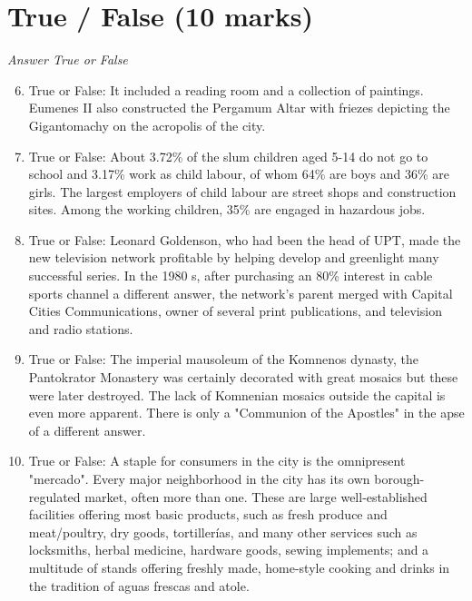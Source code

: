 \documentclass[12pt]{article}
\begin{document}
\section*{True / False (10 marks)}
\textit{Answer True or False}
\begin{enumerate}[label=\arabic*.]
\setcounter{enumi}{5}
\item True or False: It included a reading room and a collection of paintings. Eumenes II also constructed the Pergamum Altar with friezes depicting the Gigantomachy on the acropolis of the city.
\item True or False: About 3.72\% of the slum children aged 5-14 do not go to school and 3.17\% work as child labour, of whom 64\% are boys and 36\% are girls. The largest employers of child labour are street shops and construction sites. Among the working children, 35\% are engaged in hazardous jobs.
\item True or False: Leonard Goldenson, who had been the head of UPT, made the new television network profitable by helping develop and greenlight many successful series. In the 1980 s, after purchasing an 80\% interest in cable sports channel a different answer, the network's parent merged with Capital Cities Communications, owner of several print publications, and television and radio stations.
\item True or False: The imperial mausoleum of the Komnenos dynasty, the Pantokrator Monastery was certainly decorated with great mosaics but these were later destroyed. The lack of Komnenian mosaics outside the capital is even more apparent. There is only a "Communion of the Apostles" in the apse of a different answer.
\item True or False: A staple for consumers in the city is the omnipresent "mercado". Every major neighborhood in the city has its own borough-regulated market, often more than one. These are large well-established facilities offering most basic products, such as fresh produce and meat/poultry, dry goods, tortillerías, and many other services such as locksmiths, herbal medicine, hardware goods, sewing implements; and a multitude of stands offering freshly made, home-style cooking and drinks in the tradition of aguas frescas and atole.
\end{enumerate}
\end{document}
